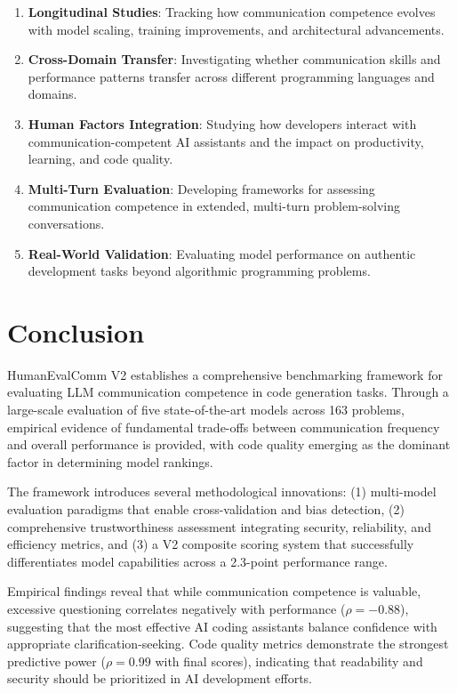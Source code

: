 \documentclass[conference]{IEEEtran}
\begin{document}
\begin{enumerate}
    \item \textbf{Longitudinal Studies}: Tracking how communication competence evolves with model scaling, training improvements, and architectural advancements.
    \item \textbf{Cross-Domain Transfer}: Investigating whether communication skills and performance patterns transfer across different programming languages and domains.
    \item \textbf{Human Factors Integration}: Studying how developers interact with communication-competent AI assistants and the impact on productivity, learning, and code quality.
    \item \textbf{Multi-Turn Evaluation}: Developing frameworks for assessing communication competence in extended, multi-turn problem-solving conversations.
    \item \textbf{Real-World Validation}: Evaluating model performance on authentic development tasks beyond algorithmic programming problems.
\end{enumerate}

\section{Conclusion}

HumanEvalComm V2 establishes a comprehensive benchmarking framework for evaluating LLM communication competence in code generation tasks. Through a large-scale evaluation of five state-of-the-art models across 163 problems, empirical evidence of fundamental trade-offs between communication frequency and overall performance is provided, with code quality emerging as the dominant factor in determining model rankings.

The framework introduces several methodological innovations: (1) multi-model evaluation paradigms that enable cross-validation and bias detection, (2) comprehensive trustworthiness assessment integrating security, reliability, and efficiency metrics, and (3) a V2 composite scoring system that successfully differentiates model capabilities across a 2.3-point performance range.

Empirical findings reveal that while communication competence is valuable, excessive questioning correlates negatively with performance ($\rho = -0.88$), suggesting that the most effective AI coding assistants balance confidence with appropriate clarification-seeking. Code quality metrics demonstrate the strongest predictive power ($\rho = 0.99$ with final scores), indicating that readability and security should be prioritized in AI development efforts.
\end{document}
